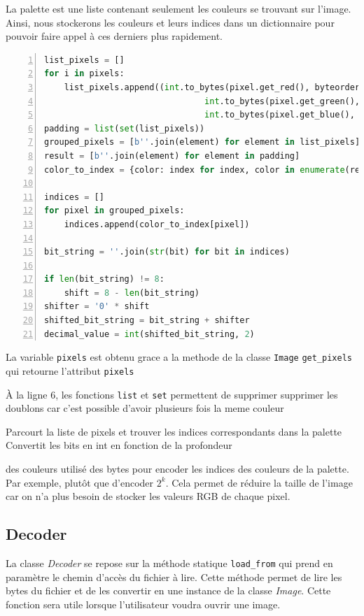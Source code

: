\documentclass[utf8]{article}
\begin{document}
La palette est une liste contenant seulement les couleurs se trouvant sur l'image. Ainsi, nous stockerons les couleurs et leurs indices dans un dictionnaire pour pouvoir faire appel à ces derniers plus rapidement.

\begin{lstlisting}[language=Python, basicstyle=\small, numbers=left]
list_pixels = []
for i in pixels: 
	list_pixels.append((int.to_bytes(pixel.get_red(), byteorder='little'),
                                int.to_bytes(pixel.get_green(), byteorder='little'),
                                int.to_bytes(pixel.get_blue(), byteorder='little'))
padding = list(set(list_pixels))  
grouped_pixels = [b''.join(element) for element in list_pixels]
result = [b''.join(element) for element in padding]
color_to_index = {color: index for index, color in enumerate(result)}

indices = []
for pixel in grouped_pixels:   	
	indices.append(color_to_index[pixel])

bit_string = ''.join(str(bit) for bit in indices)

if len(bit_string) != 8:  
	shift = 8 - len(bit_string)
shifter = '0' * shift
shifted_bit_string = bit_string + shifter
decimal_value = int(shifted_bit_string, 2)

\end{lstlisting}
La variable \texttt{pixels} est obtenu grace a la methode de la classe \texttt{Image} \texttt{get_pixels} qui retourne l'attribut \texttt{pixels}

À la ligne 6, les fonctions \texttt{list} et \texttt{set} permettent de supprimer supprimer les doublons car c'est possible d'avoir plusieurs fois la meme couleur

Parcourt la liste de pixels et trouver les indices correspondants dans la palette
Convertit les bits en int en fonction de la profondeur

des couleurs utilisé des bytes pour encoder les indices des couleurs de la palette. Par exemple, plutôt que d'encoder $2^k$. Cela permet de réduire la taille de l'image car on n'a plus besoin de stocker les valeurs RGB de chaque pixel.
\subsection{Decoder}
La classe \textit{Decoder} se repose sur la méthode statique \texttt{load_from} qui prend en paramètre le chemin d'accès du fichier à lire. Cette méthode permet de lire les bytes du fichier et de les convertir en une instance de la classe \textit{Image}. Cette fonction sera utile lorsque l'utilisateur voudra ouvrir une image.
\end{document}
